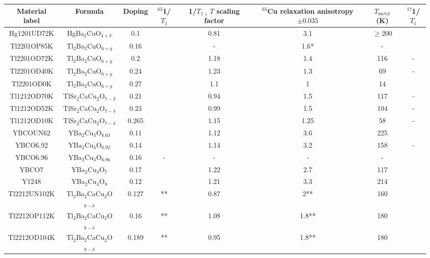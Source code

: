 \documentclass[preprint,superscriptaddress,amsmath,amssymb,aps,physrev,prb,floatfix, fleqn]{revtex4-2} \usepackage{bm} %
\begin{document}
\begin{table}[h]
\tiny
\centering
\begin{tabular}{|c|c|c|c|c|c|c|c|}
\hline
Material label & Formula & Doping&  $^{63}$1/$T_1$ &1/$T_{1\perp}T$ scaling factor & $^{63}$Cu relaxation anisotropy $\pm0.035$ & $T_{\mathrm{metal}}$ (K) & $^{17}$1/$T_1$\\
\hline
Hg1201UD72K & HgBa$_2$CuO$_{4+\delta}$ & 0.1 & \cite{Gippius1999}  & 0.81& 3.1 &$\geq 200$& \cite{Bobroff1997} \\
\hline
Tl2201OP85K & Tl$_2$Ba$_2$CuO$_{6+y}$ & 0.16 & \cite{Kambe1993} &-& 1.6* & -&\cite{Kambe1993} \\
\hline
Tl2201OD72K & Tl$_2$Ba$_2$CuO$_{6+y}$ & 0.2  & \cite{Fujiwara1991} &1.18 & 1.4 &116& - \\
\hline
Tl2201OD40K & Tl$_2$Ba$_2$CuO$_{6+y}$ & 0.24  & \cite{Fujiwara1991}& 1.23 &1.3 &69 & - \\
\hline
Tl2201OD0K & Tl$_2$Ba$_2$CuO$_{6+y}$ & 0.27  & \cite{Fujiwara1991} & 1.1 & 1 &14& \cite{Kambe1991} \\
\hline
Tl1212OD70K & TlSr$_2$CaCu$_2$O$_{7-\delta}$ & 0.21  & \cite{Magishi1996} & 0.94& 1.5&117 & -\\
\hline
Tl1212OD52K & TlSr$_2$CaCu$_2$O$_{7-\delta}$ & 0.23  & \cite{Magishi1996}&0.99& 1.5  &104& -\\
\hline
Tl1212OD10K & TlSr$_2$CaCu$_2$O$_{7-\delta}$ & 0.265  & \cite{Magishi1996}& 1.15& 1.25 &58& -\\
\hline
YBCOUN62 & YBa$_2$Cu$_3$O$_{6.63}$ & 0.11& \cite{Takigawa1991}&1.12 & 3.6 &225& \cite{Takigawa1991}\\
\hline
YBCO6.92 & YBa$_2$Cu$_3$O$_{6.92}$ & 0.14 &  \cite{Auler1999}& 1.14 & 3.2&158 &-\\
\hline
YBCO6.96 & YBa$_2$Cu$_3$O$_{6.96}$ & 0.16 &  -&- &- &-&\cite{Yoshinari1992}\\
\hline
YBCO7 & YBa$_2$Cu$_3$O$_7$ & 0.17 & \cite{Walstedt1989} &1.22& 2.7 &117& \cite{Kitaoka1989}\\
\hline
Y1248 & YBa$_2$Cu$_4$O$_8$ & 0.12 & \cite{Zimmermann1991} &1.21& 3.3 &214& \cite{Bankay1994}\\
\hline
Tl2212UN102K & Tl$_2$Ba$_2$CaCu$_2$O$_{8-\delta}$ & 0.127 &  \cite{Gerashchenko1999} **&0.87& 2**&160 & \cite{Gerashchenko1999}\\
\hline
Tl2212OP112K & Tl$_2$Ba$_2$CaCu$_2$O$_{8-\delta}$ & 0.16 &  \cite{Gerashchenko1999} ** &1.08& 1.8** &180& \cite{Gerashchenko1999}\\
\hline
Tl2212OD104K & Tl$_2$Ba$_2$CaCu$_2$O$_{8-\delta}$ & 0.189 & \cite{Gerashchenko1999} **&0.95 & 1.8** &180& \cite{Gerashchenko1999}\\

\end{tabular}
\end{table}
\end{document}
